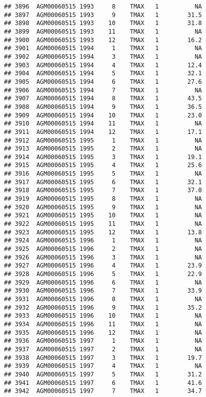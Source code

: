\documentclass{article}\usepackage[]{graphicx}\usepackage[]{color}
\makeatletter
\newenvironment{kframe}{%
 \def\at@end@of@kframe{}%
 \ifinner\ifhmode%
  \def\at@end@of@kframe{\end{minipage}}%
  \begin{minipage}{\columnwidth}%
 \fi\fi%
 \def\FrameCommand##1{\hskip\@totalleftmargin \hskip-\fboxsep
 \colorbox{shadecolor}{##1}\hskip-\fboxsep
     \hskip-\linewidth \hskip-\@totalleftmargin \hskip\columnwidth}%
 \MakeFramed {\advance\hsize-\width
   \@totalleftmargin\z@ \linewidth\hsize
   \@setminipage}}%
 {\par\unskip\endMakeFramed%
 \at@end@of@kframe}
\newenvironment{knitrout}{}{} %
\makeatother
\begin{document}
\begin{knitrout}
\begin{kframe}
\begin{verbatim}
## 3896  AGM00060515 1993     8    TMAX   1          NA
## 3897  AGM00060515 1993     9    TMAX   1        31.5
## 3898  AGM00060515 1993    10    TMAX   1        31.8
## 3899  AGM00060515 1993    11    TMAX   1          NA
## 3900  AGM00060515 1993    12    TMAX   1        16.2
## 3901  AGM00060515 1994     1    TMAX   1          NA
## 3902  AGM00060515 1994     3    TMAX   1          NA
## 3903  AGM00060515 1994     4    TMAX   1        12.4
## 3904  AGM00060515 1994     5    TMAX   1        32.1
## 3905  AGM00060515 1994     6    TMAX   1        27.6
## 3906  AGM00060515 1994     7    TMAX   1          NA
## 3907  AGM00060515 1994     8    TMAX   1        43.5
## 3908  AGM00060515 1994     9    TMAX   1        36.5
## 3909  AGM00060515 1994    10    TMAX   1        23.0
## 3910  AGM00060515 1994    11    TMAX   1          NA
## 3911  AGM00060515 1994    12    TMAX   1        17.1
## 3912  AGM00060515 1995     1    TMAX   1          NA
## 3913  AGM00060515 1995     2    TMAX   1          NA
## 3914  AGM00060515 1995     3    TMAX   1        19.1
## 3915  AGM00060515 1995     4    TMAX   1        25.6
## 3916  AGM00060515 1995     5    TMAX   1          NA
## 3917  AGM00060515 1995     6    TMAX   1        32.1
## 3918  AGM00060515 1995     7    TMAX   1        37.0
## 3919  AGM00060515 1995     8    TMAX   1          NA
## 3920  AGM00060515 1995     9    TMAX   1          NA
## 3921  AGM00060515 1995    10    TMAX   1          NA
## 3922  AGM00060515 1995    11    TMAX   1          NA
## 3923  AGM00060515 1995    12    TMAX   1        13.8
## 3924  AGM00060515 1996     1    TMAX   1          NA
## 3925  AGM00060515 1996     2    TMAX   1          NA
## 3926  AGM00060515 1996     3    TMAX   1          NA
## 3927  AGM00060515 1996     4    TMAX   1        23.9
## 3928  AGM00060515 1996     5    TMAX   1        22.9
## 3929  AGM00060515 1996     6    TMAX   1          NA
## 3930  AGM00060515 1996     7    TMAX   1        33.9
## 3931  AGM00060515 1996     8    TMAX   1          NA
## 3932  AGM00060515 1996     9    TMAX   1        35.2
## 3933  AGM00060515 1996    10    TMAX   1          NA
## 3934  AGM00060515 1996    11    TMAX   1          NA
## 3935  AGM00060515 1996    12    TMAX   1          NA
## 3936  AGM00060515 1997     1    TMAX   1          NA
## 3937  AGM00060515 1997     2    TMAX   1          NA
## 3938  AGM00060515 1997     3    TMAX   1        19.7
## 3939  AGM00060515 1997     4    TMAX   1          NA
## 3940  AGM00060515 1997     5    TMAX   1        31.2
## 3941  AGM00060515 1997     6    TMAX   1        41.6
## 3942  AGM00060515 1997     7    TMAX   1        34.7

\end{verbatim}
\end{kframe}
\end{knitrout}
\end{document}
